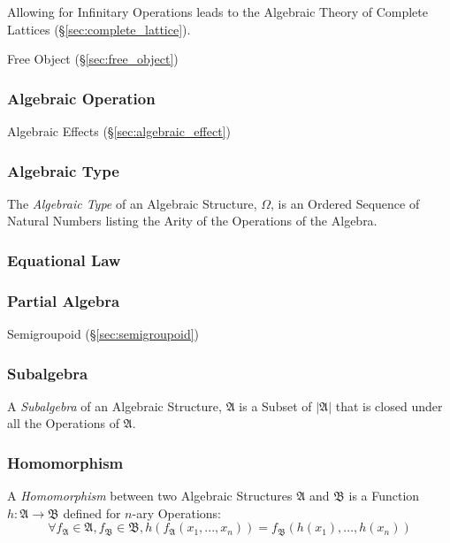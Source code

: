 Allowing for Infinitary Operations leads to the Algebraic Theory of
Complete Lattices (\S\ref{sec:complete_lattice}).

Free Object (\S\ref{sec:free_object})



\subsubsection{Algebraic Operation}\label{sec:algebraic_operation}

Algebraic Effects (\S\ref{sec:algebraic_effect})



\subsubsection{Algebraic Type}\label{sec:algebraic_type}

The \emph{Algebraic Type} of an Algebraic Structure, $\Omega$, is an
Ordered Sequence of Natural Numbers listing the Arity of the
Operations of the Algebra.



\subsubsection{Equational Law}\label{sec:equational_law}

\subsubsection{Partial Algebra}\label{sec:partial_algebra}

Semigroupoid (\S\ref{sec:semigroupoid})



\subsubsection{Subalgebra}\label{sec:subalgebra}

A \emph{Subalgebra} of an Algebraic Structure, $\mathfrak{A}$ is a
Subset of $|\mathfrak{A}|$ that is closed under all the Operations of
$\mathfrak{A}$.



\subsubsection{Homomorphism}\label{sec:homomorphism}

A \emph{Homomorphism} between two Algebraic Structures $\mathfrak{A}$
and $\mathfrak{B}$ is a Function $h: \mathfrak{A} \rightarrow
\mathfrak{B}$ defined for $n$-ary Operations:
\[
  \forall f_\mathfrak{A} \in \mathfrak{A}, f_\mathfrak{B} \in
  \mathfrak{B}, h(f_\mathfrak{A}(x_1, ..., x_n)) =
  f_\mathfrak{B}(h(x_1), ..., h(x_n))
\]

